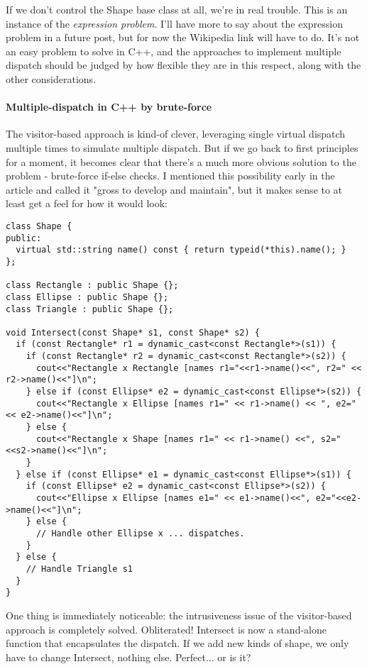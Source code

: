 \documentclass{book}
\begin{document}
If we don't control the Shape base class at all, we're in real trouble.
This is an instance of the \textit{expression problem}.
I'll have more to say about the expression problem in a future post, but for now the Wikipedia link will have to do.
It's not an easy problem to solve in C++, and the approaches to implement multiple dispatch should be judged by how flexible they are in this respect, along with the other considerations.
\paragraph{Multiple-dispatch in C++ by brute-force}

The visitor-based approach is kind-of clever, leveraging single virtual dispatch multiple times to simulate multiple dispatch.
But if we go back to first principles for a moment, it becomes clear that there's a much more obvious solution to the problem - brute-force if-else checks.
I mentioned this possibility early in the article and called it "gross to develop and maintain", but it makes sense to at least get a feel for how it would look:
\begin{lstlisting}
class Shape {
public:
  virtual std::string name() const { return typeid(*this).name(); }
};

class Rectangle : public Shape {};
class Ellipse : public Shape {};
class Triangle : public Shape {};

void Intersect(const Shape* s1, const Shape* s2) {
  if (const Rectangle* r1 = dynamic_cast<const Rectangle*>(s1)) {
    if (const Rectangle* r2 = dynamic_cast<const Rectangle*>(s2)) {
      cout<<"Rectangle x Rectangle [names r1="<<r1->name()<<", r2=" << r2->name()<<"]\n";
    } else if (const Ellipse* e2 = dynamic_cast<const Ellipse*>(s2)) {
      cout<<"Rectangle x Ellipse [names r1=" << r1->name() << ", e2=" << e2->name()<<"]\n";
    } else {
      cout<<"Rectangle x Shape [names r1=" << r1->name() <<", s2="<<s2->name()<<"]\n";
    }
  } else if (const Ellipse* e1 = dynamic_cast<const Ellipse*>(s1)) {
    if (const Ellipse* e2 = dynamic_cast<const Ellipse*>(s2)) {
      cout<<"Ellipse x Ellipse [names e1=" << e1->name()<<", e2="<<e2->name()<<"]\n";
    } else {
      // Handle other Ellipse x ... dispatches.
    }
  } else {
    // Handle Triangle s1
  }
}
\end{lstlisting}
One thing is immediately noticeable: the intrusiveness issue of the visitor-based approach is completely solved.
Obliterated! Intersect is now a stand-alone function that encapsulates the dispatch. If we add new kinds of shape, we only have to change Intersect, nothing else. Perfect... or is it?
\end{document}
